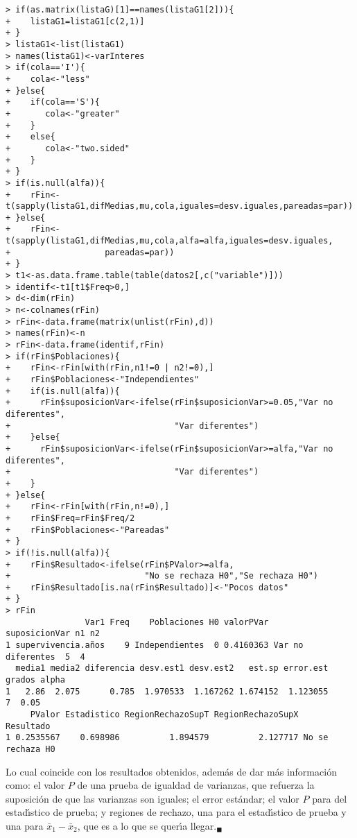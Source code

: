 \begin{solucion}
\begin{verbatim}
> if(as.matrix(listaG)[1]==names(listaG1[2])){
+    listaG1=listaG1[c(2,1)]
+ }
> listaG1<-list(listaG1)
> names(listaG1)<-varInteres
> if(cola=='I'){
+    cola<-"less"
+ }else{
+    if(cola=='S'){
+       cola<-"greater"
+    }
+    else{
+       cola<-"two.sided"
+    }
+ }
> if(is.null(alfa)){
+    rFin<-t(sapply(listaG1,difMedias,mu,cola,iguales=desv.iguales,pareadas=par))
+ }else{
+    rFin<-t(sapply(listaG1,difMedias,mu,cola,alfa=alfa,iguales=desv.iguales,
+                   pareadas=par))
+ }
> t1<-as.data.frame.table(table(datos2[,c("variable")]))
> identif<-t1[t1$Freq>0,]
> d<-dim(rFin)
> n<-colnames(rFin)
> rFin<-data.frame(matrix(unlist(rFin),d))
> names(rFin)<-n
> rFin<-data.frame(identif,rFin)
> if(rFin$Poblaciones){
+    rFin<-rFin[with(rFin,n1!=0 | n2!=0),]
+    rFin$Poblaciones<-"Independientes"
+    if(is.null(alfa)){
+      rFin$suposicionVar<-ifelse(rFin$suposicionVar>=0.05,"Var no diferentes",
+                                 "Var diferentes")
+    }else{
+      rFin$suposicionVar<-ifelse(rFin$suposicionVar>=alfa,"Var no diferentes",
+                                 "Var diferentes")
+    }
+ }else{
+    rFin<-rFin[with(rFin,n!=0),]
+    rFin$Freq=rFin$Freq/2
+    rFin$Poblaciones<-"Pareadas"
+ }
> if(!is.null(alfa)){
+    rFin$Resultado<-ifelse(rFin$PValor>=alfa,
+                           "No se rechaza H0","Se rechaza H0")
+    rFin$Resultado[is.na(rFin$Resultado)]<-"Pocos datos"
+ }
> rFin
                Var1 Freq    Poblaciones H0 valorPVar     suposicionVar n1 n2
1 supervivencia.años    9 Independientes  0 0.4160363 Var no diferentes  5  4
  media1 media2 diferencia desv.est1 desv.est2   est.sp error.est grados alpha
1   2.86  2.075      0.785  1.970533  1.167262 1.674152  1.123055      7  0.05
     PValor Estadistico RegionRechazoSupT RegionRechazoSupX        Resultado
1 0.2535567    0.698986          1.894579          2.127717 No se rechaza H0
 \end{verbatim}
 \vspace{-0.5cm}
 Lo cual coincide con los resultados obtenidos,
 adem\'as de dar m\'as informaci\'on
 como: el valor $P$ de una prueba de igualdad de varianzas,
 que refuerza la suposici\'on de que las varianzas son iguales;
 el error est\'andar;
 el valor $P$ para del estad\'{\i}stico de prueba;
 y regiones de rechazo, una para el estad\'{\i}stico de prueba
 y una para $\bar{x}_1 - \bar{x}_2$,
 que es a lo que se quer\'{\i}a llegar.${}_{\blacksquare}$
\end{solucion}
